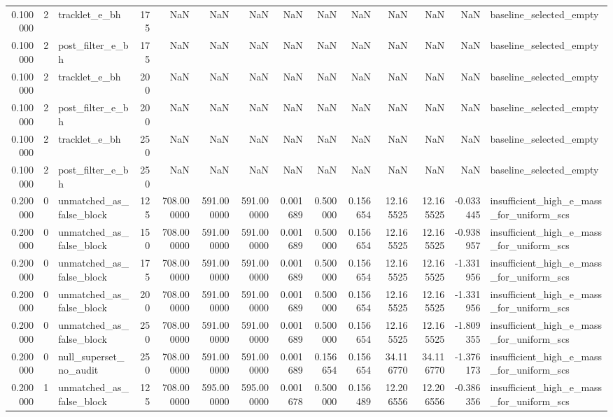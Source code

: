 \begin{tabular}{rrlrrrrrrrrrrl}
0.100000 & 2 & tracklet_e_bh & 175 & NaN & NaN & NaN & NaN & NaN & NaN & NaN & NaN & NaN & baseline_selected_empty \\
0.100000 & 2 & post_filter_e_bh & 175 & NaN & NaN & NaN & NaN & NaN & NaN & NaN & NaN & NaN & baseline_selected_empty \\
0.100000 & 2 & tracklet_e_bh & 200 & NaN & NaN & NaN & NaN & NaN & NaN & NaN & NaN & NaN & baseline_selected_empty \\
0.100000 & 2 & post_filter_e_bh & 200 & NaN & NaN & NaN & NaN & NaN & NaN & NaN & NaN & NaN & baseline_selected_empty \\
0.100000 & 2 & tracklet_e_bh & 250 & NaN & NaN & NaN & NaN & NaN & NaN & NaN & NaN & NaN & baseline_selected_empty \\
0.100000 & 2 & post_filter_e_bh & 250 & NaN & NaN & NaN & NaN & NaN & NaN & NaN & NaN & NaN & baseline_selected_empty \\
0.200000 & 0 & unmatched_as_false_block & 125 & 708.000000 & 591.000000 & 591.000000 & 0.001689 & 0.500000 & 0.156654 & 12.165525 & 12.165525 & -0.033445 & insufficient_high_e_mass_for_uniform_scs \\
0.200000 & 0 & unmatched_as_false_block & 150 & 708.000000 & 591.000000 & 591.000000 & 0.001689 & 0.500000 & 0.156654 & 12.165525 & 12.165525 & -0.938957 & insufficient_high_e_mass_for_uniform_scs \\
0.200000 & 0 & unmatched_as_false_block & 175 & 708.000000 & 591.000000 & 591.000000 & 0.001689 & 0.500000 & 0.156654 & 12.165525 & 12.165525 & -1.331956 & insufficient_high_e_mass_for_uniform_scs \\
0.200000 & 0 & unmatched_as_false_block & 200 & 708.000000 & 591.000000 & 591.000000 & 0.001689 & 0.500000 & 0.156654 & 12.165525 & 12.165525 & -1.331956 & insufficient_high_e_mass_for_uniform_scs \\
0.200000 & 0 & unmatched_as_false_block & 250 & 708.000000 & 591.000000 & 591.000000 & 0.001689 & 0.500000 & 0.156654 & 12.165525 & 12.165525 & -1.809355 & insufficient_high_e_mass_for_uniform_scs \\
0.200000 & 0 & null_superset_no_audit & 250 & 708.000000 & 591.000000 & 591.000000 & 0.001689 & 0.156654 & 0.156654 & 34.116770 & 34.116770 & -1.376173 & insufficient_high_e_mass_for_uniform_scs \\
0.200000 & 1 & unmatched_as_false_block & 125 & 708.000000 & 595.000000 & 595.000000 & 0.001678 & 0.500000 & 0.156489 & 12.206556 & 12.206556 & -0.386356 & insufficient_high_e_mass_for_uniform_scs \\

\end{tabular}
